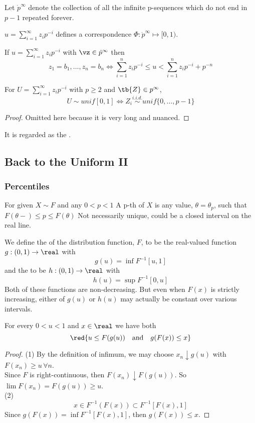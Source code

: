 \documentclass[11pt]{article}
\numberwithin{equation}{section}
\begin{document}
\notation
Let $\dot{p}^\infty$ denote the collection of all the infinite p-sequences which do not end in $p-1$ repeated forever.

$u = \sum_{i=1}^\infty z_i p^{-i}$ defines a correspondence $\Phi: \dot{p}^\infty \mapsto [0, 1)$.

If $u = \sum_{i=1}^\infty z_i p^{-i}$ with $\vz \in \dot{p}^\infty$ then
$$z_1 = b_1, \hdots, z_n = b_n \iff \sum_{i=1}^n z_i p^{-i} \leq u < \sum_{i=1}^n z_i p^{-i} + p^{-n}$$

For $U = \sum_{i=1}^\infty z_i p^{-i}$ with $p \geq 2$ and $\tb{Z} \in p^\infty$,
$$U \sim unif[0,1] \iff Z_i \overset{i.i.d.}{\sim} unif\{0, \hdots, p-1\}$$
\begin{proof}
	Omitted here because it is very long and nuanced.
\end{proof}
\remark 
It is regarded as the .

\subsection{Back to the Uniform II}
\subsubsection{Percentiles}
For  given $X \sim F$ and any $0 < p < 1$
 A p-th  of $X$ is any value, $\theta = \theta_p$, such that $F(\theta-) \leq p \leq F(\theta)$
\remark
Not necessarily unique, could be a closed interval on the real line.

 We define the  of the distribution function, $F$, to be the real-valued function $g:(0, 1) \rightarrow \real$ with
\begin{equation}
	g(u) = \inf F^{-1}[u, 1]
\end{equation}
and the  to be
$h:(0,1) \rightarrow \real$ with
\begin{equation}
	h(u) = \sup F^{-1}[0,u]
\end{equation}
\remark
Both of these functions are non-decreasing. But even when $F(x)$ is strictly increasing, either of $g(u)$ or $h(u)$ may actually be constant over various intervals.

\proposition For every $0<u<1$ and $x \in \real$ we have both
\begin{equation}
	\red{u \leq F(g(u)) \quad \text{and} \quad g(F(x)) \leq x}
\end{equation}
\begin{proof}
	(1) By the definition of infimum, we may choose $x_n \downarrow g(u)$ with $F(x_n) \geq u \, \forall n$. \\
	Since $F$ is right-continuous, then $F(x_n) \downarrow F(g(u))$. So $\lim F(x_n) = F(g(u)) \geq u$. \\
	(2) $$x \in F^{-1}(F(x)) \subset F^{-1}[F(x), 1]$$
	Since $g(F(x)) = \inf F^{-1}[F(x), 1]$, then $g(F(x)) \leq x$.
\end{proof}
\end{document}
